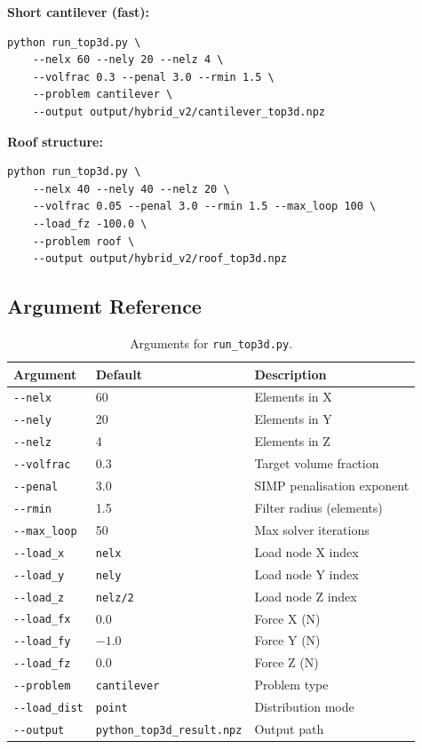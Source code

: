\documentclass[a4paper, 11pt, openany]{report}
\begin{document}
\textbf{Short cantilever (fast):}
\begin{lstlisting}[style=bashstyle]
python run_top3d.py \
    --nelx 60 --nely 20 --nelz 4 \
    --volfrac 0.3 --penal 3.0 --rmin 1.5 \
    --problem cantilever \
    --output output/hybrid_v2/cantilever_top3d.npz
\end{lstlisting}

\textbf{Roof structure:}
\begin{lstlisting}[style=bashstyle]
python run_top3d.py \
    --nelx 40 --nely 40 --nelz 20 \
    --volfrac 0.05 --penal 3.0 --rmin 1.5 --max_loop 100 \
    --load_fz -100.0 \
    --problem roof \
    --output output/hybrid_v2/roof_top3d.npz
\end{lstlisting}

\subsection{Argument Reference}

\begin{table}[htbp]
\caption{Arguments for \texttt{run\_top3d.py}.}
\label{tab:cli-top3d-args}
\centering
\begin{tabularx}{\textwidth}{llX}
\toprule
Argument & Default & Description \\
\midrule
\texttt{-{}-nelx}      & 60    & Elements in X \\
\texttt{-{}-nely}      & 20    & Elements in Y \\
\texttt{-{}-nelz}      & 4     & Elements in Z \\
\texttt{-{}-volfrac}   & 0.3   & Target volume fraction \\
\texttt{-{}-penal}     & 3.0   & SIMP penalisation exponent \\
\texttt{-{}-rmin}      & 1.5   & Filter radius (elements) \\
\texttt{-{}-max\_loop} & 50    & Max solver iterations \\
\texttt{-{}-load\_x}   & \texttt{nelx} & Load node X index \\
\texttt{-{}-load\_y}   & \texttt{nely} & Load node Y index \\
\texttt{-{}-load\_z}   & \texttt{nelz/2} & Load node Z index \\
\texttt{-{}-load\_fx}  & 0.0   & Force X (N) \\
\texttt{-{}-load\_fy}  & $-1.0$ & Force Y (N) \\
\texttt{-{}-load\_fz}  & 0.0   & Force Z (N) \\
\texttt{-{}-problem}   & \texttt{cantilever} & Problem type \\
\texttt{-{}-load\_dist}& \texttt{point} & Distribution mode \\
\texttt{-{}-output}    & \texttt{python\_top3d\_result.npz} & Output path \\
\bottomrule
\end{tabularx}
\end{table}
\end{document}
